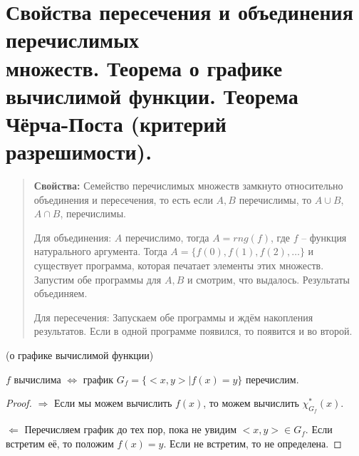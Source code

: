 \section[Пересечение и объединение перечислимых множеств. Теорема о графике вычислимой функции. Теорема
Чёрча-поста]{Свойства пересечения и объединения перечислимых\\множеств. Теорема о графике вычислимой функции.
Теорема Чёрча-Поста (критерий разрешимости).}
\begin{quote}{\textbf{Свойства: }}
	Семейство перечислимых множеств замкнуто относительно объединения и пересечения, то есть если $A, B$ перечислимы,
	то $A \cup B$, $A \cap B$, перечислимы.
	\par Для объединения: $A$ перечислимо, тогда $A=rng(f)$, где $f$ -- функция натурального аргумента. Тогда $A = \{
		f(0), f(1), f(2), \dots \}$ и существует программа, которая печатает элементы этих множеств. Запустим обе
	программы для $A, B$ и смотрим, что выдалось. Результаты объединяем.
	\par Для пересечения: Запускаем обе программы и ждём накопления результатов. Если в одной программе появился, то
	появится и во второй.
\end{quote}
\begin{theorem}{(о графике вычислимой функции)}
	\par$f$ вычислима $\iff$ график $G_{f} = \{<x,y> | f(x) = y\}$ перечислим.
	\begin{proof}
		\par $\Longrightarrow$ Если мы можем вычислить $f(x)$, то можем вычислить $\chi^*_{G_f}(x)$.
		\par $\Longleftarrow$ Перечисляем график до тех пор, пока не увидим $<x,y> \in G_{f}$. Если встретим её, то
		положим $f(x) = y$. Если не встретим, то не определена.
	\end{proof}
\end{theorem}

